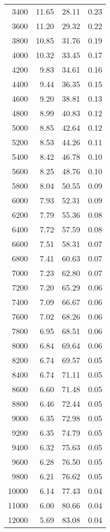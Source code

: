 \begin{table}[ht]
\begin{tabular}{rrrr}
   3400 & 11.65 & 28.11 & 0.23 \\ 
   3600 & 11.20 & 29.32 & 0.22 \\ 
   3800 & 10.85 & 31.76 & 0.19 \\ 
   4000 & 10.32 & 33.45 & 0.17 \\ 
   4200 & 9.83 & 34.61 & 0.16 \\ 
   4400 & 9.44 & 36.35 & 0.15 \\ 
   4600 & 9.20 & 38.81 & 0.13 \\ 
   4800 & 8.99 & 40.83 & 0.12 \\ 
   5000 & 8.85 & 42.64 & 0.12 \\ 
   5200 & 8.53 & 44.26 & 0.11 \\ 
   5400 & 8.42 & 46.78 & 0.10 \\ 
   5600 & 8.25 & 48.76 & 0.10 \\ 
   5800 & 8.04 & 50.55 & 0.09 \\ 
   6000 & 7.93 & 52.31 & 0.09 \\ 
   6200 & 7.79 & 55.36 & 0.08 \\ 
   6400 & 7.72 & 57.59 & 0.08 \\ 
   6600 & 7.51 & 58.31 & 0.07 \\ 
   6800 & 7.41 & 60.63 & 0.07 \\ 
   7000 & 7.23 & 62.80 & 0.07 \\ 
   7200 & 7.20 & 65.29 & 0.06 \\ 
   7400 & 7.09 & 66.67 & 0.06 \\ 
   7600 & 7.02 & 68.26 & 0.06 \\ 
   7800 & 6.95 & 68.51 & 0.06 \\ 
   8000 & 6.84 & 69.64 & 0.06 \\ 
   8200 & 6.74 & 69.57 & 0.05 \\ 
   8400 & 6.74 & 71.11 & 0.05 \\ 
   8600 & 6.60 & 71.48 & 0.05 \\ 
   8800 & 6.46 & 72.44 & 0.05 \\ 
   9000 & 6.35 & 72.98 & 0.05 \\ 
   9200 & 6.35 & 74.79 & 0.05 \\ 
   9400 & 6.32 & 75.63 & 0.05 \\ 
   9600 & 6.28 & 76.50 & 0.05 \\ 
   9800 & 6.21 & 76.62 & 0.05 \\ 
  10000 & 6.14 & 77.43 & 0.04 \\ 
  11000 & 6.00 & 80.66 & 0.04 \\ 
  12000 & 5.69 & 83.08 & 0.04 \\ 

\end{tabular}
\end{table}
